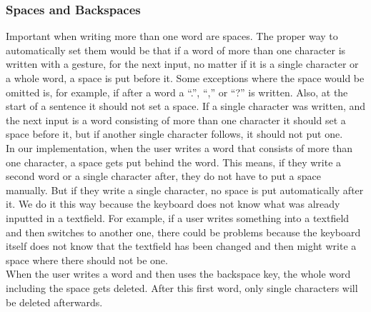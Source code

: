 \subsubsection{Spaces and Backspaces}
Important when writing more than one word are spaces. The proper way to automatically set them would be that if a word of more than one character is written with a gesture, for the next input, no matter if it is a single character or a whole word, a space is put before it. Some exceptions where the space would be omitted is, for example, if after a word a ``.'', ``,'' or ``?'' is written. Also, at the start of a sentence it should not set a space. If a single character was written, and the next input is a word consisting of more than one character it should set a space before it, but if another single character follows, it should not put one.\\
In our implementation, when the user writes a word that consists of more than one character, a space gets put behind the word. This means, if they write a second word or a single character after, they do not have to put a space manually. But if they write a single character, no space is put automatically after it. We do it this way because the keyboard does not know what was already inputted in a textfield. For example, if a user writes something into a textfield and then switches to another one, there could be problems because the keyboard itself does not know that the textfield has been changed and then might write a space where there should not be one.\\
When the user writes a word and then uses the backspace key, the whole word including the space gets deleted. After this first word, only single characters will be deleted afterwards.

